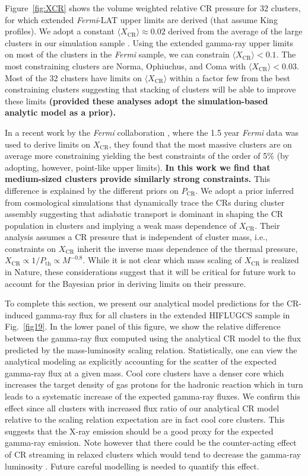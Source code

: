 \documentclass[10pt,aps,pra,reprint,amsmath,amsfonts,amssymb,showpacs,nofootinbib,floatfix]{revtex4-1}
\def\C#1{{\bf #1}}
\newcommand{\Fermi}{{\em Fermi}\xspace}
\newcommand{\rmn}{\mathrm}
\newcommand{\bra}{\langle}
\newcommand{\ket}{\rangle}
\newcommand{\CR}{\rmn{CR}}
\begin{document}
Figure~\ref{fig:XCR} shows the volume weighted relative CR pressure
for 32 clusters, for which extended \Fermi-LAT upper limits are
derived (that assume King profiles). We adopt a constant $\bra
X_\CR\ket\approx 0.02$ derived from the average of the large clusters
in our simulation sample \cite{2008MNRAS.385.1211P,
  2010MNRAS.409..449P}. Using the extended gamma-ray upper limits on
most of the clusters in the \Fermi sample, we can constrain $\bra
X_\CR \ket< 0.1$. The most constraining clusters are Norma, Ophiuchus,
and Coma with $\bra X_\CR\ket < 0.03$. Most of the 32 clusters have
limits on $\bra X_\CR\ket$ within a factor few from the best
constraining clusters suggesting that stacking of clusters will be
able to improve these limits \C{(provided these analyses adopt the
simulation-based analytic model \cite{2010MNRAS.409..449P} as a
prior).}

In a recent work by the \Fermi collaboration
\cite{2010ApJ...717L..71A}, where the 1.5 year \Fermi data was used to
derive limits on $X_\CR$, they found that the most massive clusters
are on average more constraining yielding the best constraints of the
order of 5\% (by adopting, however, point-like upper limits). \C{In
  this work we find that medium-sized clusters provide similarly
  strong constraints.} This difference is explained by the different
priors on $P_\CR$. We adopt a prior inferred from cosmological
simulations that dynamically trace the CRs during cluster assembly
suggesting that adiabatic transport is dominant in shaping the CR
population in clusters and implying a weak mass dependence of
$X_\CR$. Their analysis assumes a CR pressure that is independent of
cluster mass, i.e., constraints on $X_\CR$ inherit the inverse mass
dependence of the thermal pressure, $X_\CR\propto 1/P_\rmn{th}\propto
M^{-0.8}$. While it is not clear which mass scaling of $X_\CR$ is
realized in Nature, these considerations suggest that it will be
critical for future work to account for the Bayesian prior in deriving
limits on their pressure.

To complete this section, we present our analytical model predictions
for the CR-induced gamma-ray flux for all clusters in the extended
HIFLUGCS sample in Fig.~\ref{fig19}. In the lower panel of this
figure, we show the relative difference between the gamma-ray flux
computed using the analytical CR model to the flux predicted by the
mass-luminosity scaling relation. Statistically, one can view the
analytical modeling as explicitly accounting for the scatter of the expected
gamma-ray flux at a given mass. Cool core clusters have a denser core
which increases the target density of gas protons for the hadronic
reaction which in turn leads to a systematic increase of the expected
gamma-ray fluxes. We confirm this effect since all clusters with
increased flux ratio of our analytical CR model relative to the scaling relation
expectation are in fact cool core clusters. This suggests that the X-ray
emission should be a good proxy for the expected gamma-ray
emission. Note however that there could be the counter-acting effect
of CR streaming in relaxed clusters which would tend to decrease the
gamma-ray luminosity \cite{2011A&A...527A..99E}. Future careful
modelling is needed to quantify this effect.
\end{document}
